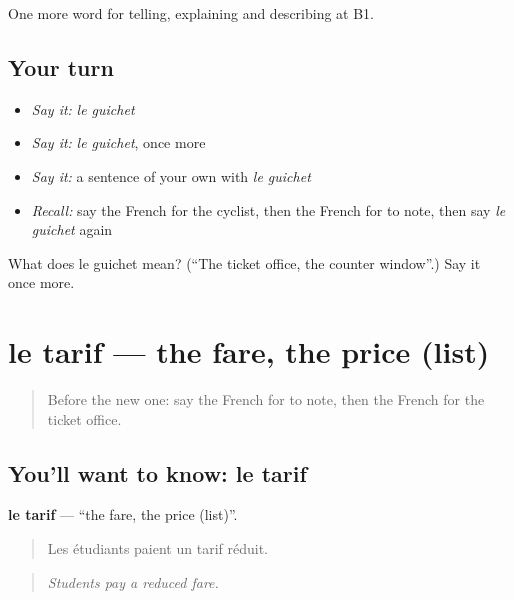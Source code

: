 \begin{grammarlens}[title={What you've built}]
One more word for telling, explaining and describing at B1.
\end{grammarlens}

\subsection*{Your turn}
\begin{itemize}
\raggedright
  \item \emph{Say it:} \emph{le guichet}
  \item \emph{Say it:} \emph{le guichet}, once more
  \item \emph{Say it:} a sentence of your own with \emph{le guichet}
  \item \emph{Recall:} say the French for the cyclist, then the French for to note, then say \emph{le guichet} again
\end{itemize}

\begin{tcolorbox}[breakable,colback=teal!4,colframe=teal!35!black,title={Before you move on}]
What does le guichet mean? (\textquotedblleft{}The ticket office, the counter window\textquotedblright{}.) Say it once more.
\end{tcolorbox}
\section[le tarif]{le tarif — the fare, the price (list)}

\label{lesson:FR-C412-tarif}



\begin{quote}
Before the new one: say the French for to note, then the French for the ticket office.
\end{quote}

\subsection*{You'll want to know: le tarif}
\textbf{le tarif} — \textquotedblleft{}the fare, the price (list)\textquotedblright{}.

\begin{quote}
Les étudiants paient un tarif réduit.
\end{quote}

\begin{quote}
\emph{Students pay a reduced fare.}
\end{quote}

